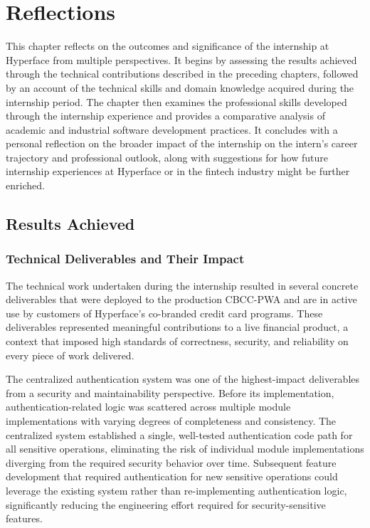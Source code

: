 \chapter{Reflections}

This chapter reflects on the outcomes and significance of the internship at Hyperface from multiple perspectives. It begins by assessing the results achieved through the technical contributions described in the preceding chapters, followed by an account of the technical skills and domain knowledge acquired during the internship period. The chapter then examines the professional skills developed through the internship experience and provides a comparative analysis of academic and industrial software development practices. It concludes with a personal reflection on the broader impact of the internship on the intern's career trajectory and professional outlook, along with suggestions for how future internship experiences at Hyperface or in the fintech industry might be further enriched.

\section{Results Achieved}

\subsection{Technical Deliverables and Their Impact}

The technical work undertaken during the internship resulted in several concrete deliverables that were deployed to the production CBCC-PWA and are in active use by customers of Hyperface's co-branded credit card programs. These deliverables represented meaningful contributions to a live financial product, a context that imposed high standards of correctness, security, and reliability on every piece of work delivered.

The centralized authentication system was one of the highest-impact deliverables from a security and maintainability perspective. Before its implementation, authentication-related logic was scattered across multiple module implementations with varying degrees of completeness and consistency. The centralized system established a single, well-tested authentication code path for all sensitive operations, eliminating the risk of individual module implementations diverging from the required security behavior over time. Subsequent feature development that required authentication for new sensitive operations could leverage the existing system rather than re-implementing authentication logic, significantly reducing the engineering effort required for security-sensitive features.

